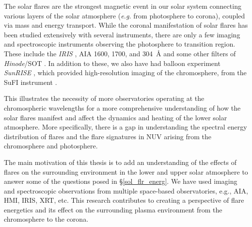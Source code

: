 
The solar flares are the strongest magnetic event in our solar system connecting various layers of the solar atmosphere ({\it e.g.} from photosphere to corona), coupled via mass and energy transport. While the coronal manifestation of solar flares has been studied extensively with several instruments, there are only a few imaging and spectroscopic instruments observing the photosphere to transition region. These include the {\it IRIS} \citep{iris}, AIA 1600, 1700, and 304~{\AA} \citep{aia} and some other filters of {\it Hinode}/SOT \citep{sot}. In addition to these, we also have had balloon experiment {\it SunRISE} \citep{Sunrise1,Sunrise2}, which provided high-resolution imaging of the chromosphere, from the SuFI instrument \citep{sufi}.

This illustrates the necessity of more observatories operating at the chromospheric wavelengths for a more comprehensive understanding of how the solar flares manifest and affect the dynamics and heating of the lower solar atmosphere. More specifically, there is a gap in understanding the spectral energy distribution of flares and the flare signatures in NUV arising from the chromosphere and photosphere. 

The main motivation of this thesis is to add an understanding of the effects of flares on the surrounding environment in the lower and upper solar atmosphere to answer some of the questions posed in \S\ref{sol_flr_energ}. We have used imaging and spectroscopic observations from multiple space-based observatories, e.g., AIA, HMI, IRIS, XRT, etc. This research contributes to creating a perspective of flare energetics and its effect on the surrounding plasma environment from the chromosphere to the corona.



